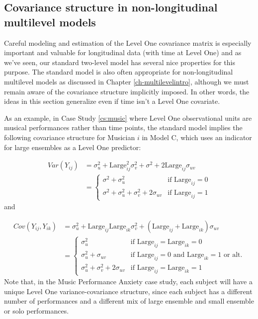 \documentclass[
]{krantz}
\begin{document}
\hypertarget{covariance-structure-in-non-longitudinal-multilevel-models}{%
\subsection{Covariance structure in non-longitudinal multilevel models}\label{covariance-structure-in-non-longitudinal-multilevel-models}}

Careful modeling and estimation of the Level One covariance matrix is especially important and valuable for longitudinal data (with time at Level One) and as we've seen, our standard two-level model has several nice properties for this purpose. The standard model is also often appropriate for non-longitudinal multilevel models as discussed in Chapter \ref{ch-multilevelintro}, although we must remain aware of the covariance structure implicitly imposed. In other words, the ideas in this section generalize even if time isn't a Level One covariate.

As an example, in Case Study \ref{cs:music} where Level One observational units are musical performances rather than time points, the standard model implies the following covariance structure for Musician \(i\) in Model C, which uses an indicator for large ensembles as a Level One predictor:

\begin{align*}
Var(Y_{ij}) & = \sigma_{u}^{2} + \textrm{Large}^{2}_{ij} \sigma_{v}^{2} + \sigma^{2} + 2\textrm{Large}_{ij}\sigma_{uv} \\
 & = \left\{ \begin{array}{ll}
                 \sigma^{2} + \sigma_{u}^{2} & \mbox{if $\textrm{Large}_{ij}=0$} \\
                 \sigma^{2} + \sigma_{u}^{2} + \sigma_{v}^{2} + 2\sigma_{uv} & \mbox{if $\textrm{Large}_{ij}=1$}
               \end{array}
       \right.
\end{align*}
\noindent and

\begin{align*}
Cov(Y_{ij},Y_{ik}) & = \sigma_{u}^{2} + \textrm{Large}_{ij}\textrm{Large}_{ik} \sigma_{v}^{2} + (\textrm{Large}_{ij} + 
  \textrm{Large}_{ik}) \sigma_{uv} \\
 & = \left\{ \begin{array}{ll}
                 \sigma_{u}^{2} & \mbox{if $\textrm{Large}_{ij}=\textrm{Large}_{ik}=0$} \\
                 \sigma_{u}^{2} + \sigma_{uv} & \mbox{if $\textrm{Large}_{ij}=0$ and $\textrm{Large}_{ik}=1$ or alt.} \\
                 \sigma_{u}^{2} + \sigma_{v}^{2} + 2\sigma_{uv} & \mbox{if $\textrm{Large}_{ij}=\textrm{Large}_{ik}=1$}
               \end{array}
       \right.
\end{align*}
Note that, in the Music Performance Anxiety case study, each subject will have a unique Level One variance-covariance structure, since each subject has a different number of performances and a different mix of large ensemble and small ensemble or solo performances.
\end{document}
